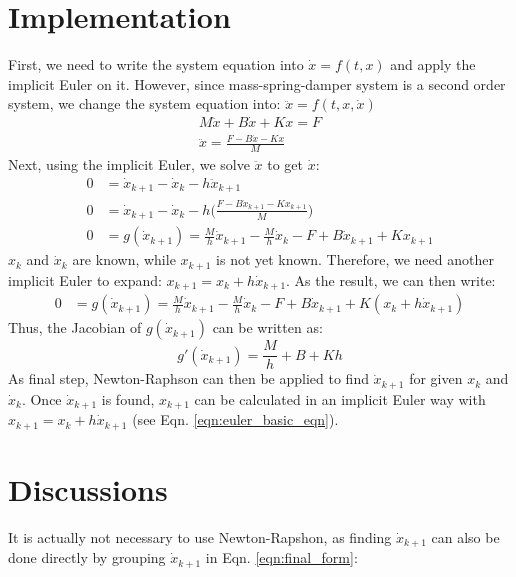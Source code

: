 \documentclass[english, 11pt]{article}
\begin{document}
\section{Implementation}
First, we need to write the system equation into $\dot{x} = f(t,x)$ and apply the implicit Euler on it. However, since mass-spring-damper system is a second order system, we change the system equation into: $\ddot{x} = f(t, x, \dot{x})$ 
\begin{equation}
  \begin{split}
    M\ddot{x}+B\dot{x}+Kx = F \\
    \ddot{x}=\frac{F-B\dot{x}-Kx}{M}
  \end{split}
\end{equation}
Next, using the implicit Euler, we solve $\ddot{x}$ to get $\dot{x}$:
\begin{equation}
  \begin{split}
    0 &= \dot{x}_{k+1}-\dot{x}_{k} - h \ddot{x}_{k+1} \\
    0 &= \dot{x}_{k+1}-\dot{x}_{k} - h \bigg(\frac{F-B\dot{x}_{k+1}-Kx_{k+1}}{M}\bigg) \\
    0 &= g(\dot{x}_{k+1}) = \frac{M}{h}\dot{x}_{k+1}-\frac{M}{h}\dot{x}_{k} - F+B\dot{x}_{k+1}+Kx_{k+1}
  \end{split}
\end{equation}	
$x_{k}$ and $\dot{x}_k$ are known, while $x_{k+1}$ is not yet known. Therefore, we need another implicit Euler to expand: $x_{k+1} = x_k + h \dot{x}_{k+1}$. As the result, we can then write:
\begin{equation} 
  \label{eqn:final_form}
  \begin{split}
    0 &= g(\dot{x}_{k+1}) = \frac{M}{h}\dot{x}_{k+1}-\frac{M}{h}\dot{x}_{k} - F+B\dot{x}_{k+1}+K(x_k+h\dot{x}_{k+1})
  \end{split}
\end{equation}
Thus, the Jacobian of $g(\dot{x}_{k+1})$ can be written as:
\begin{equation}
  g'(\dot{x}_{k+1})=\frac{M}{h}+B+Kh
\end{equation}
As final step, Newton-Raphson can then be applied to find $\dot{x}_{k+1}$ for given $x_k$ and $\dot{x}_k$. Once $\dot{x}_{k+1}$ is found, $x_{k+1}$ can be calculated in an implicit Euler way with $x_{k+1} = x_k + h \dot{x}_{k+1}$ (see Eqn. \ref{eqn:euler_basic_eqn}).

\section{Discussions}
It is actually not necessary to use Newton-Rapshon, as finding $\dot{x}_{k+1}$ can also be done directly by grouping $\dot{x}_{k+1}$ in Eqn. \ref{eqn:final_form}:
\end{document}

